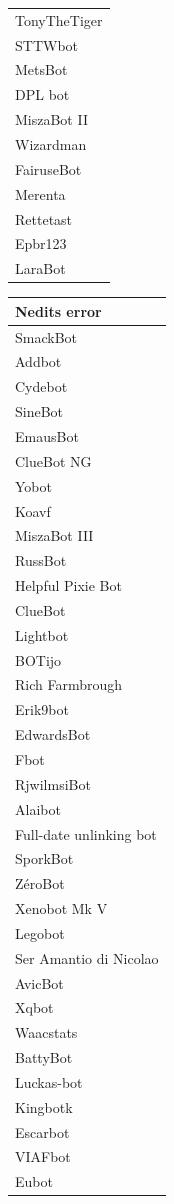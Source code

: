 \documentclass{article}
\begin{document}
\begin{landscape}
\begin{table}
\begin{center}
\begin{tabular}{l}
TonyTheTiger \\
STTWbot \\
MetsBot \\
DPL bot \\
MiszaBot II \\
Wizardman \\
FairuseBot \\
Merenta \\
Rettetast \\
Epbr123 \\
LaraBot \\
\end{tabular}
\begin{tabular}{l}
\hline
 Nedits error \\
\hline
SmackBot \\
Addbot \\
Cydebot \\
SineBot \\
EmausBot \\
ClueBot NG \\
Yobot \\
Koavf \\
MiszaBot III \\
RussBot \\
Helpful Pixie Bot \\
ClueBot \\
Lightbot \\
BOTijo \\
Rich Farmbrough \\
Erik9bot \\
EdwardsBot \\
Fbot \\
RjwilmsiBot \\
Alaibot \\
Full-date unlinking bot \\
SporkBot \\
ZéroBot \\
Xenobot Mk V \\
Legobot \\
Ser Amantio di Nicolao \\
AvicBot \\
Xqbot \\
Waacstats \\
BattyBot \\
Luckas-bot \\
Kingbotk \\
Escarbot \\
VIAFbot \\
Eubot \\

\end{tabular}
\end{center}
\end{table}
\end{landscape}
\end{document}
